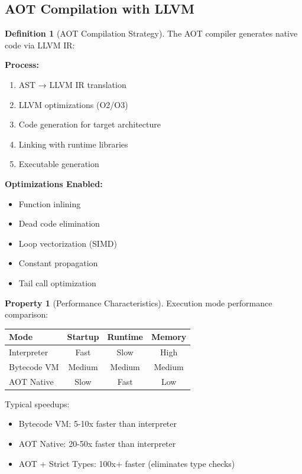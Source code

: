 \documentclass[12pt,a4paper]{article}
\theoremstyle{definition}
\newtheorem{definition}{Definition}[section]
\newtheorem{property}{Property}[section]
\begin{document}
\subsection{AOT Compilation with LLVM}

\begin{definition}[AOT Compilation Strategy]
The AOT compiler generates native code via LLVM IR:

\textbf{Process:}
\begin{enumerate}[leftmargin=*]
    \item AST → LLVM IR translation
    \item LLVM optimizations (O2/O3)
    \item Code generation for target architecture
    \item Linking with runtime libraries
    \item Executable generation
\end{enumerate}

\textbf{Optimizations Enabled:}
\begin{itemize}[leftmargin=*]
    \item Function inlining
    \item Dead code elimination
    \item Loop vectorization (SIMD)
    \item Constant propagation
    \item Tail call optimization
\end{itemize}
\end{definition}

\begin{property}[Performance Characteristics]
Execution mode performance comparison:

\begin{center}
\begin{tabular}{|l|c|c|c|}
\hline
\textbf{Mode} & \textbf{Startup} & \textbf{Runtime} & \textbf{Memory} \\
\hline
Interpreter & Fast & Slow & High \\
Bytecode VM & Medium & Medium & Medium \\
AOT Native & Slow & Fast & Low \\
\hline
\end{tabular}
\end{center}

Typical speedups:
\begin{itemize}[leftmargin=*]
    \item Bytecode VM: 5-10x faster than interpreter
    \item AOT Native: 20-50x faster than interpreter
    \item AOT + Strict Types: 100x+ faster (eliminates type checks)
\end{itemize}
\end{property}
\end{document}
